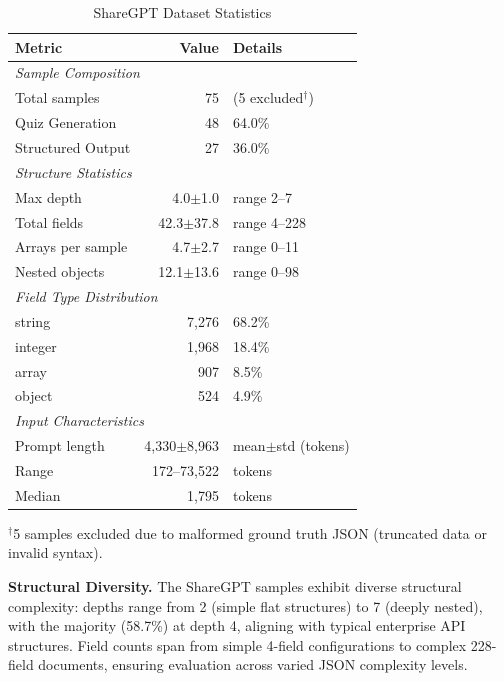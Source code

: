 \documentclass{article}
\theoremstyle{plain}
\theoremstyle{definition}
\begin{document}
\begin{table}[h]
\centering
\caption{ShareGPT Dataset Statistics}
\label{tab:sharegpt-dataset-stats}
\scriptsize
\begin{tabular}{@{}lrl@{}}
\toprule
\textbf{Metric} & \textbf{Value} & \textbf{Details} \\
\midrule
\multicolumn{3}{l}{\textit{Sample Composition}} \\
Total samples & 75 & (5 excluded$^\dagger$) \\
\quad Quiz Generation & 48 & 64.0\% \\
\quad Structured Output & 27 & 36.0\% \\
\midrule
\multicolumn{3}{l}{\textit{Structure Statistics}} \\
Max depth & 4.0$\pm$1.0 & range 2--7 \\
Total fields & 42.3$\pm$37.8 & range 4--228 \\
Arrays per sample & 4.7$\pm$2.7 & range 0--11 \\
Nested objects & 12.1$\pm$13.6 & range 0--98 \\
\midrule
\multicolumn{3}{l}{\textit{Field Type Distribution}} \\
\quad string & 7,276 & 68.2\% \\
\quad integer & 1,968 & 18.4\% \\
\quad array & 907 & 8.5\% \\
\quad object & 524 & 4.9\% \\
\midrule
\multicolumn{3}{l}{\textit{Input Characteristics}} \\
Prompt length & 4,330$\pm$8,963 & mean$\pm$std (tokens) \\
\quad Range & 172--73,522 & tokens \\
\quad Median & 1,795 & tokens \\
\bottomrule
\end{tabular}

\vspace{0.3em}
\raggedright\scriptsize $^\dagger$5 samples excluded due to malformed ground truth JSON (truncated data or invalid syntax).
\end{table}

\textbf{Structural Diversity.} The ShareGPT samples exhibit diverse structural complexity: depths range from 2 (simple flat structures) to 7 (deeply nested), with the majority (58.7\%) at depth 4, aligning with typical enterprise API structures. Field counts span from simple 4-field configurations to complex 228-field documents, ensuring evaluation across varied JSON complexity levels.
\end{document}
